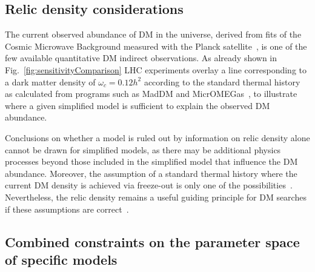 \subsection{Relic density considerations}


The current observed abundance of DM in the universe, derived from fits of the Cosmic Microwave Background measured with the Planck satellite~\cite{Ade:2015xua}, is one of the few %
available quantitative DM indirect observations. 
As already shown in Fig.~\ref{fig:sensitivityComparison} LHC experiments overlay a line corresponding to  a dark matter density of $\omega_c = 0.12 h^2$ according to the standard thermal history as calculated from programs such as MadDM and MicrOMEGas~\cite{Backovic:2015cra,Barducci:2016pcb}, to illustrate where a given simplified model is sufficient to explain the observed DM abundance. 

Conclusions on whether a model is ruled out by information on relic density alone cannot be drawn for simplified models, as there may be additional physics processes beyond those included in the simplified model that influence the DM abundance.
Moreover, the assumption of a standard thermal history where the current DM density is achieved via freeze-out is only one of the possibilities~\cite{Bernal:2017kxu}. 
Nevertheless, the relic density remains a useful guiding principle for DM searches if these assumptions are correct~\cite{Busoni:2014gta,Catena:2017xqq}. 

\subsection{Combined constraints on the parameter space of specific models}





